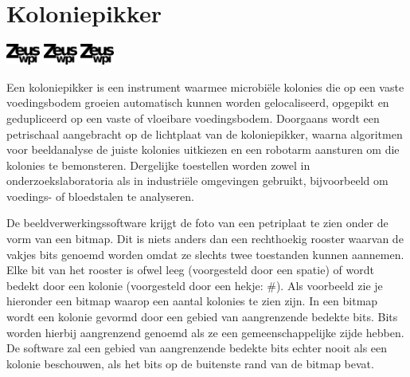 \documentclass[a4paper]{article}
\begin{document}
\section*{Koloniepikker}
\flushright
\includegraphics[width=3em]{../logo-new.png}
\includegraphics[width=3em]{../logo-new.png}
\includegraphics[width=3em]{../logo-new.png}
\flushleft

Een koloniepikker is een instrument waarmee microbi\"ele kolonies die op een
vaste voedingsbodem groeien automatisch kunnen worden gelocaliseerd, opgepikt
en gedupliceerd op een vaste of vloeibare voedingsbodem. Doorgaans wordt een
petrischaal aangebracht op de lichtplaat van de koloniepikker, waarna
algoritmen voor beeldanalyse de juiste kolonies uitkiezen en een robotarm
aansturen om die kolonies te bemonsteren. Dergelijke toestellen worden zowel in
onderzoekslaboratoria als in industri\"ele omgevingen gebruikt, bijvoorbeeld om
voedings- of bloedstalen te analyseren.

De beeldverwerkingssoftware krijgt de foto van een petriplaat te zien onder de
vorm van een bitmap. Dit is niets anders dan een rechthoekig rooster waarvan de
vakjes bits genoemd worden omdat ze slechts twee toestanden kunnen aannemen.
Elke bit van het rooster is ofwel leeg (voorgesteld door een spatie) of wordt
bedekt door een kolonie (voorgesteld door een hekje: \#). Als voorbeeld zie je
hieronder een bitmap waarop een aantal kolonies te zien zijn. In een bitmap
wordt een kolonie gevormd door een gebied van aangrenzende bedekte bits. Bits
worden hierbij aangrenzend genoemd als ze een gemeenschappelijke zijde hebben.
De software zal een gebied van aangrenzende bedekte bits echter nooit als een
kolonie beschouwen, als het bits op de buitenste rand van de bitmap bevat.
\end{document}
